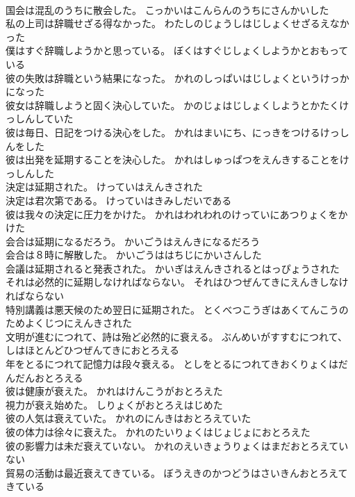 \documentclass[8pt]{extreport}
\begin{document}
\begin{CJK}{UTF8}{min}
\\	国会は混乱のうちに散会した。	こっかいはこんらんのうちにさんかいした 
\\	私の上司は辞職せざる得なかった。	わたしのじょうしはじしょくせざるえなかった 
\\	僕はすぐ辞職しようかと思っている。	ぼくはすぐじしょくしようかとおもっている 
\\	彼の失敗は辞職という結果になった。	かれのしっぱいはじしょくというけっかになった 
\\	彼女は辞職しようと固く決心していた。	かのじょはじしょくしようとかたくけっしんしていた 
\\	彼は毎日、日記をつける決心をした。	かれはまいにち、にっきをつけるけっしんをした 
\\	彼は出発を延期することを決心した。	かれはしゅっぱつをえんきすることをけっしんした 
\\	決定は延期された。	けっていはえんきされた 
\\	決定は君次第である。	けっていはきみしだいである 
\\	彼は我々の決定に圧力をかけた。	かれはわれわれのけっていにあつりょくをかけた 
\\	会合は延期になるだろう。	かいごうはえんきになるだろう 
\\	会合は８時に解散した。	かいごうははちじにかいさんした 
\\	会議は延期されると発表された。	かいぎはえんきされるとはっぴょうされた 
\\	それは必然的に延期しなければならない。	それはひつぜんてきにえんきしなければならない 
\\	特別講義は悪天候のため翌日に延期された。	とくべつこうぎはあくてんこうのためよくじつにえんきされた 
\\	文明が進むにつれて、詩は殆ど必然的に衰える。	ぶんめいがすすむにつれて、しはほとんどひつぜんてきにおとろえる 
\\	年をとるにつれて記憶力は段々衰える。	としをとるにつれてきおくりょくはだんだんおとろえる 
\\	彼は健康が衰えた。	かれはけんこうがおとろえた 
\\	視力が衰え始めた。	しりょくがおとろえはじめた 
\\	彼の人気は衰えていた。	かれのにんきはおとろえていた 
\\	彼の体力は徐々に衰えた。	かれのたいりょくはじょじょにおとろえた 
\\	彼の影響力は未だ衰えていない。	かれのえいきょうりょくはまだおとろえていない 
\\	貿易の活動は最近衰えてきている。	ぼうえきのかつどうはさいきんおとろえてきている 

\end{CJK}
\end{document}
